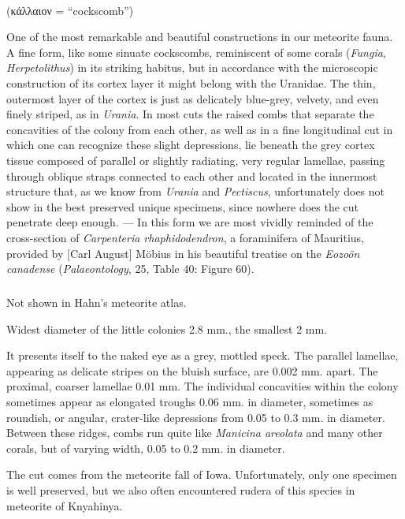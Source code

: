 \documentclass[a4paper, 12pt, oneside]{article}
\begin{document}
\paragraph*{}
(κάλλαιον = ``cockscomb'')%

One of the most remarkable and beautiful constructions in our meteorite fauna. A fine form, like some sinuate cockscombs, reminiscent of some corals (\emph{Fungia}, \emph{Herpetolithus}) in its striking habitus, but in accordance with the microscopic construction of its cortex layer it might belong with the Uranidae. The thin, outermost layer of the cortex is just as delicately blue-grey, velvety, and even finely striped, as in \emph{Urania}. In most cuts the raised combs that separate the concavities of the colony from each other, as well as in a fine longitudinal cut in which one can recognize these slight depressions, lie beneath the grey cortex tissue composed of parallel or slightly radiating, very regular lamellae, passing through oblique straps connected to each other and located in the innermost structure that, as we know from \emph{Urania} and \emph{Pectiscus}, unfortunately does not show in the best preserved unique specimens, since nowhere does the cut penetrate deep enough. --- In this form we are most vividly reminded of the cross-section of \emph{Carpenteria rhaphidodendron}, a foraminifera of Mauritius, provided by [Carl August] Möbius in his beautiful treatise on the \emph{Eozoön canadense} (\emph{Palaeontology}, 25, Table 40: Figure 60).
\paragraph{\large{}}
\subparagraph{}
Not shown in Hahn's meteorite atlas.

Widest diameter of the little colonies 2.8 mm., the smallest 2 mm.

It presents itself to the naked eye as a grey, mottled speck. The parallel lamellae, appearing as delicate stripes on the bluish surface, are 0.002 mm. apart. The proximal, coarser lamellae 0.01 mm. The individual concavities within the colony sometimes appear as elongated troughs 0.06 mm. in diameter, sometimes as roundish, or angular, crater-like depressions from 0.05 to 0.3 mm. in diameter. Between these ridges, combs run quite like \emph{Manicina areolata} and many other corals, but of varying width, 0.05 to 0.2 mm. in diameter.

The cut comes from the meteorite fall of Iowa. Unfortunately, only one specimen is well preserved, but we also often encountered rudera of this species in meteorite of Knyahinya.
\end{document}
